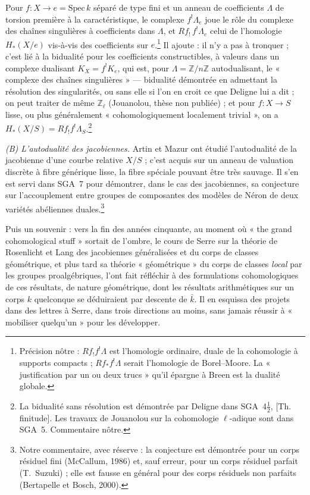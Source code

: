 \documentclass[11pt,a4paper]{article}
\begin{document}
Pour $f : X \to e = \mathrm{Spec}\,k$ séparé de type fini et un anneau de
coefficients $\Lambda$ de torsion première à la caractéristique, le
complexe $f^!\Lambda_e$ joue le rôle du complexe des chaînes singulières à
coefficients dans $\Lambda$, et $Rf_!\,f^!\Lambda_e$ celui de l'homologie
$H_*(X/e)$ vis-à-vis des coefficients sur $e$.\footnote{Précision nôtre :
$Rf_!f^!\Lambda$ est l'homologie ordinaire, duale de la cohomologie à
supports compacts ; $Rf_*f^!\Lambda$ serait l'homologie de Borel--Moore.
La « justification par un ou deux trucs » qu'il épargne à Breen est la
dualité globale.} Il ajoute : il n'y a pas à tronquer ; c'est lié à la
bidualité pour les coefficients constructibles, à valeurs dans un complexe
dualisant $K_X = f^!K_e$, qui est, pour $\Lambda = \mathbb{Z}/n\mathbb{Z}$
autodualisant, le « complexe des chaînes singulières » --- bidualité
démontrée en admettant la résolution des singularités, ou sans elle si l'on
en croit ce que Deligne lui a dit ; on peut traiter de même
$\mathbb{Z}_\ell$ (Jouanolou, thèse non publiée) ; et pour $f : X \to S$
lisse, ou plus généralement « cohomologiquement localement trivial », on a
$H_*(X/S) = Rf_!f^!\Lambda_S$.\footnote{La bidualité sans résolution est
démontrée par Deligne dans SGA~4$\tfrac12$, [Th. finitude]. Les travaux de
Jouanolou sur la cohomologie $\ell$-adique sont dans SGA~5. Commentaire
nôtre.}

\emph{(B) L'autodualité des jacobiennes.} Artin et Mazur ont étudié
l'autodualité de la jacobienne d'une courbe relative $X/S$ ; c'est acquis
sur un anneau de valuation discrète à fibre générique lisse, la fibre
spéciale pouvant être très sauvage. Il s'en est servi dans SGA~7 pour
démontrer, dans le cas des jacobiennes, sa conjecture sur l'accouplement
entre groupes de composantes des modèles de Néron de deux variétés
abéliennes duales.\footnote{Notre commentaire, avec réserve : la
conjecture est démontrée pour un corps résiduel fini (McCallum, 1986) et,
sauf erreur, pour un corps résiduel parfait (T.~Suzuki) ; elle est fausse en
général pour des corps résiduels non parfaits (Bertapelle et Bosch, 2000).}

Puis un souvenir : vers la fin des années cinquante, au moment où « the
grand cohomological stuff » sortait de l'ombre, le cours de Serre sur la
théorie de Rosenlicht et Lang des jacobiennes généralisées et du corps de
classes géométrique, et plus tard sa théorie « géométrique » du corps de
classes \emph{local} par les groupes proalgébriques, l'ont fait réfléchir à
des formulations cohomologiques de ces résultats, de nature géométrique,
dont les résultats arithmétiques sur un corps $k$ quelconque se
déduiraient par descente de $\bar k$. Il en esquissa des projets dans des
lettres à Serre, dans trois directions au moins, sans jamais réussir à
« mobiliser quelqu'un » pour les développer.
\end{document}
